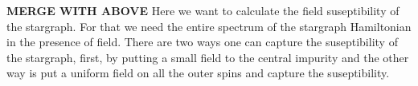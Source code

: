 \documentclass[reprint,prb,superscriptaddress]{revtex4-2}
\begin{document}


\textbf{MERGE WITH ABOVE}
\noindent Here we want to calculate the field suseptibility of the stargraph. For that we need the entire spectrum of the stargraph Hamiltonian in the presence of field. There are two ways one can capture the suseptibility of the stargraph, first, by putting a small field to the central impurity and the other way is put a uniform field on all the outer spins and capture the suseptibility.
\end{document}
